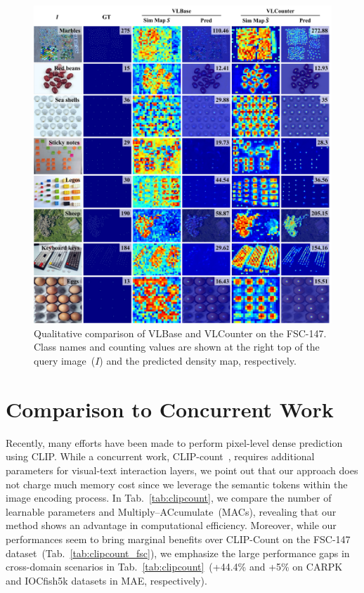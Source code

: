 \begin{figure}[t]
    \begin{center}
        \includegraphics[width=\linewidth]{figs/qualitative_suppl.pdf}
    \end{center}
    \caption{
        Qualitative comparison of VLBase and VLCounter on the FSC-147.
        Class names and counting values are shown at the right top of the query image~($I$) and the predicted density map, respectively.
    }
    \label{fig:qualitative_results_suppl}
\end{figure}

\section{Comparison to Concurrent Work}
Recently, many efforts have been made to perform pixel-level dense prediction using CLIP.
While a concurrent work, CLIP-count~\cite{jiang2023clip}, requires additional parameters for visual-text interaction layers, we point out that our approach does not charge much memory cost since we leverage the semantic tokens within the image encoding process.
In Tab.~\ref{tab:clipcount}, we compare the number of learnable parameters and Multiply–ACcumulate~(MACs), revealing that our method shows an advantage in computational efficiency.
Moreover, while our performances seem to bring marginal benefits over CLIP-Count on the FSC-147 dataset~(Tab.~\ref{tab:clipcount_fsc}), we emphasize the large performance gaps in cross-domain scenarios in Tab.~\ref{tab:clipcount}~(+44.4\% and +5\% on CARPK and IOCfish5k datasets in MAE, respectively).

